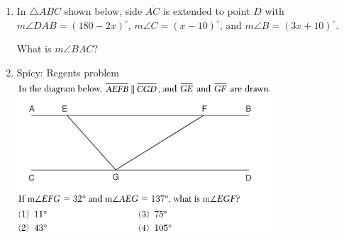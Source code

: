 \documentclass[12pt, twoside]{article}
\begin{document}
\begin{enumerate}
  \item In  $\triangle ABC$ shown below, side $\overline{AC}$ is extended to point $D$ with $m\angle DAB=(180-2x)^\circ$, $m\angle C=(x-10)^\circ$, and $m\angle B=(3x+10)^\circ$.
    \begin{center}
    \end{center}
    What is $m\angle BAC$?

  \item Spicy: Regents problem\\
    \includegraphics[width=0.75\textwidth]{4-3_ext-tri-sum.png}
    \vspace{2cm}

\end{enumerate}
\end{document}
